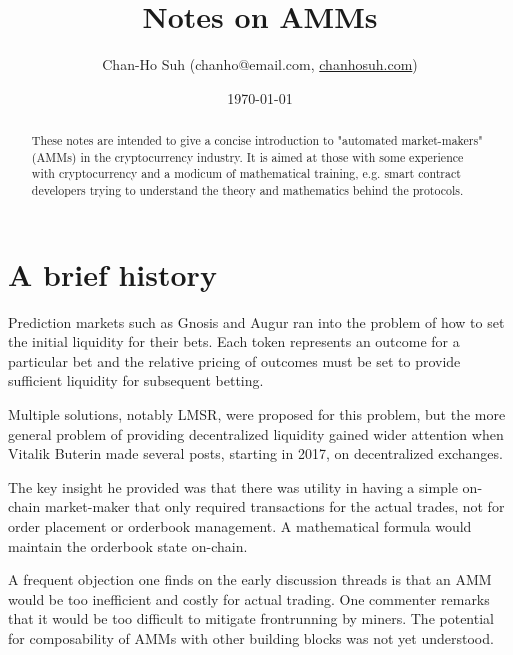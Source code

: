 \documentclass[nohyper]{tufte-handout}
\begin{document}
\renewcommand{\abstractname}{\vspace{-\baselineskip}}

\title{Notes on AMMs}
\author{\small{Chan-Ho Suh} \footnotesize{({chanho@email.com}, 
\href{http://www.chanhosuh.com}{chanhosuh.com})}}
\date{\today}


\maketitle


\begin{abstract}
\noindent
{}
    These notes are intended to give a concise introduction to "automated market-makers" (AMMs) in the cryptocurrency industry.  It is aimed at those with some experience with cryptocurrency and a modicum of mathematical training, e.g. smart contract developers trying to understand the theory and mathematics behind the protocols.
\end{abstract}


\section{A brief history}\label{history}
Prediction markets such as Gnosis and Augur ran into the problem of how to set the initial liquidity for their bets.  Each token represents an outcome for a particular bet and the relative pricing of outcomes must be set to provide sufficient liquidity for subsequent betting.

Multiple solutions, notably LMSR, were proposed for this problem, but the more general problem of providing decentralized liquidity gained wider attention when Vitalik Buterin made several posts, starting in 2017, on decentralized exchanges.

The key insight he provided was that there was utility in having a simple on-chain market-maker that only required transactions for the actual trades, not for order placement or orderbook management.  A mathematical formula would maintain the orderbook state on-chain.  

A frequent objection one finds on the early discussion threads is that an AMM would be too inefficient and costly for actual trading.  One commenter remarks that it would be too difficult to mitigate frontrunning by miners.  The potential for composability of AMMs with other building blocks was not yet understood.
\end{document}
